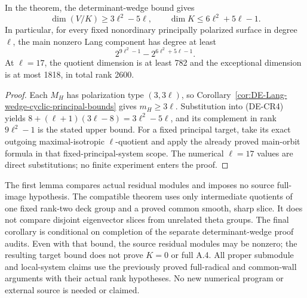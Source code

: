 \begin{corollary}
\label{cor:DE-prime-compatible-wedge-bound}
In the theorem, the determinant-wedge bound gives
\[
 \dim(V/K)\ge3\ell^2-5\ell,
 \qquad \dim K\le6\ell^2+5\ell-1.
 \tag{DE-CR8}
\]
In particular, for every fixed nonordinary principally polarized
surface in degree \(\ell\), the main nonzero Lang component has
degree at least
\[
          2^{9\ell^2-1}-2^{6\ell^2+5\ell-1}.
 \tag{DE-CR9}
\]
At \(\ell=17\), the quotient dimension is at least 782 and
the exceptional dimension is at most 1818, in total rank 2600.
\end{corollary}
\begin{proof}
Each \(M_H\) has polarization type \((3,3\ell)\), so
Corollary~\ref{cor:DE-Lang-wedge-cyclic-principal-bounds} gives
\(m_H\ge3\ell\). Substitution into (DE-CR4) yields
\(8+(\ell+1)(3\ell-8)=3\ell^2-5\ell\), and its
complement in rank \(9\ell^2-1\) is the stated upper bound.
For a fixed principal target, take its exact outgoing
maximal-isotropic \(\ell\)-quotient and apply the already
proved main-orbit formula in that fixed-principal-system scope.
The numerical \(\ell=17\) values are direct substitutions;
no finite experiment enters the proof.
\end{proof}

\begin{remark}
\label{rem:DE-compatible-residual-module-scope}
The first lemma compares actual residual modules and imposes no
source full-image hypothesis. The compatible theorem uses only
intermediate quotients of one fixed rank-two deck group and a
proved common smooth, sharp slice. It does not compare disjoint
eigenvector slices from unrelated theta groups.
The final corollary is conditional on completion of the separate
determinant-wedge proof audits. Even with that bound, the source
residual modules may be nonzero; the resulting target bound does
not prove \(K=0\) or full A.4. All proper submodule and local-system
claims use the previously proved full-radical and common-wall
arguments with their actual rank hypotheses. No new numerical
program or external source is needed or claimed.
\end{remark}
